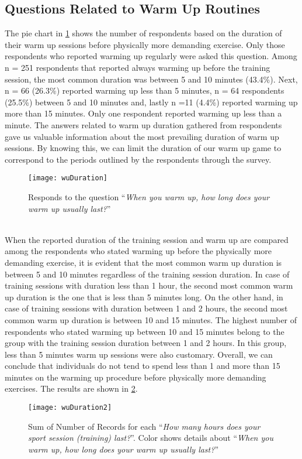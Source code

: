 \subsection{Questions Related to Warm Up Routines}
The pie chart in \ref{fig:wuDuration} shows the number of respondents based on the duration of their warm up sessions before physically more demanding exercise. Only those respondents who reported warming up regularly were asked this question. Among n = 251 respondents that reported always warming up before the training session, the most common duration was between 5 and 10 minutes (43.4\%). Next, n = 66 (26.3\%) reported warming up less than 5 minutes, n = 64 respondents (25.5\%) between 5 and 10 minutes and, lastly n =11 (4.4\%) reported warming up more than 15 minutes. Only one respondent reported warming up less than a minute. The answers related to warm up duration gathered from respondents gave us valuable information about the most prevailing duration of warm up sessions. By knowing this, we can limit the duration of our warm up game to correspond to the periods outlined by the respondents through the survey.   
\begin{figure}[h]
    \centering
    \texttt{[image: wuDuration]}
    \caption{ Responds to the question ``\textit{When you warm up, how long does your warm up usually last?}''}
    \label{fig:wuDuration}
\end{figure}\\
When the reported duration of the training session and warm up are compared among the respondents who stated warming up before the physically more demanding exercise, it is evident that the most common warm up duration is between 5 and 10 minutes regardless of the training session duration. In case of training sessions with duration less than 1 hour, the second most common warm up duration is the one that is less than 5 minutes long. On the other hand, in case of training sessions with duration between 1 and 2 hours, the second most common warm up duration is between 10 and 15 minutes. The highest number of respondents who stated warming up between 10 and 15 minutes belong to the group with the training session duration between 1 and 2 hours. In this group, less than 5 minutes warm up sessions were also customary. Overall, we can conclude that individuals do not tend to spend less than 1 and more than 15 minutes on the warming up procedure before physically more demanding exercises. The results are shown in \ref{fig:wuDuration2}.\\
\begin{figure}[h]
    \centering
    \texttt{[image: wuDuration2]}
    \caption{Sum of Number of Records for each ``\textit{How many hours does your sport session (training) last?}''. Color shows details about ``\textit{When you warm up, how long does your warm up usually last?}''}
    \label{fig:wuDuration2}
\end{figure}\\
